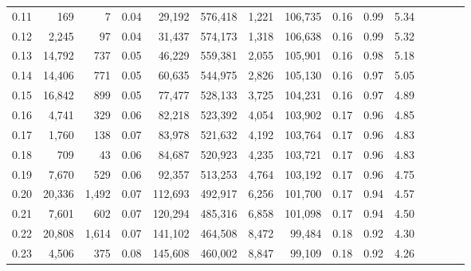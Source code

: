 \begin{tabular}{rrrcrrrrrrrrrrr}
0.11 &     169 &      7 &                                       0.04 &   29,192 &  576,418 &    1,221 &  106,735 &  0.16 &  0.99 &                         5.34 \\
0.12 &   2,245 &     97 &                                       0.04 &   31,437 &  574,173 &    1,318 &  106,638 &  0.16 &  0.99 &                         5.32 \\
0.13 &  14,792 &    737 &                                       0.05 &   46,229 &  559,381 &    2,055 &  105,901 &  0.16 &  0.98 &                         5.18 \\
0.14 &  14,406 &    771 &                                       0.05 &   60,635 &  544,975 &    2,826 &  105,130 &  0.16 &  0.97 &                         5.05 \\
0.15 &  16,842 &    899 &                                       0.05 &   77,477 &  528,133 &    3,725 &  104,231 &  0.16 &  0.97 &                         4.89 \\
0.16 &   4,741 &    329 &                                       0.06 &   82,218 &  523,392 &    4,054 &  103,902 &  0.17 &  0.96 &                         4.85 \\
0.17 &   1,760 &    138 &                                       0.07 &   83,978 &  521,632 &    4,192 &  103,764 &  0.17 &  0.96 &                         4.83 \\
0.18 &     709 &     43 &                                       0.06 &   84,687 &  520,923 &    4,235 &  103,721 &  0.17 &  0.96 &                         4.83 \\
0.19 &   7,670 &    529 &                                       0.06 &   92,357 &  513,253 &    4,764 &  103,192 &  0.17 &  0.96 &                         4.75 \\
0.20 &  20,336 &  1,492 &                                       0.07 &  112,693 &  492,917 &    6,256 &  101,700 &  0.17 &  0.94 &                         4.57 \\
0.21 &   7,601 &    602 &                                       0.07 &  120,294 &  485,316 &    6,858 &  101,098 &  0.17 &  0.94 &                         4.50 \\
0.22 &  20,808 &  1,614 &                                       0.07 &  141,102 &  464,508 &    8,472 &   99,484 &  0.18 &  0.92 &                         4.30 \\
0.23 &   4,506 &    375 &                                       0.08 &  145,608 &  460,002 &    8,847 &   99,109 &  0.18 &  0.92 &                         4.26 \\

\end{tabular}
